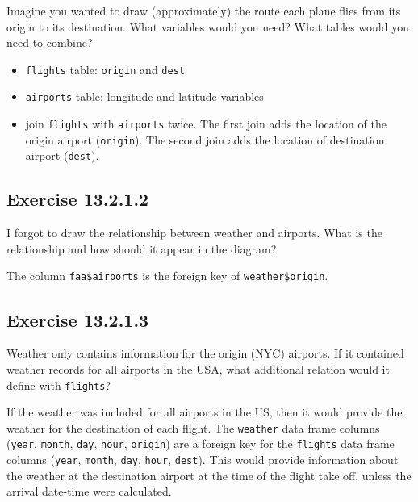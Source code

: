 \documentclass[]{book}
\providecommand{\tightlist}{%
  \setlength{\itemsep}{0pt}\setlength{\parskip}{0pt}}
\theoremstyle{plain}
\theoremstyle{remark}
\begin{document}
Imagine you wanted to draw (approximately) the route each plane flies
from its origin to its destination. What variables would you need? What
tables would you need to combine?

\begin{itemize}
\tightlist
\item
  \texttt{flights} table: \texttt{origin} and \texttt{dest}
\item
  \texttt{airports} table: longitude and latitude variables
\item
  join \texttt{flights} with \texttt{airports} twice. The first join
  adds the location of the origin airport (\texttt{origin}). The second
  join adds the location of destination airport (\texttt{dest}).
\end{itemize}

\hypertarget{exercise-13.2.1.2}{%
\subsection*{\texorpdfstring{Exercise
{13.2.1.2}}{Exercise 13.2.1.2}}\label{exercise-13.2.1.2}}

I forgot to draw the relationship between weather and airports. What is
the relationship and how should it appear in the diagram?

The column \texttt{faa\$airports} is the foreign key of
\texttt{weather\$origin}.

\hypertarget{exercise-13.2.1.3}{%
\subsection*{\texorpdfstring{Exercise
{13.2.1.3}}{Exercise 13.2.1.3}}\label{exercise-13.2.1.3}}

Weather only contains information for the origin (NYC) airports. If it
contained weather records for all airports in the USA, what additional
relation would it define with \texttt{flights}?

If the weather was included for all airports in the US, then it would
provide the weather for the destination of each flight. The
\texttt{weather} data frame columns (\texttt{year}, \texttt{month},
\texttt{day}, \texttt{hour}, \texttt{origin}) are a foreign key for the
\texttt{flights} data frame columns (\texttt{year}, \texttt{month},
\texttt{day}, \texttt{hour}, \texttt{dest}). This would provide
information about the weather at the destination airport at the time of
the flight take off, unless the arrival date-time were calculated.
\end{document}
